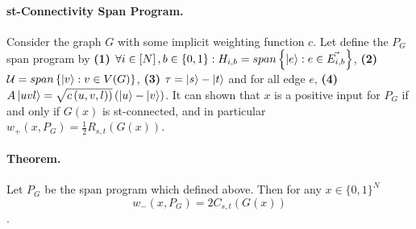 \paragraph{st-Connectivity Span Program.} Consider the graph \(G\) with some implicit weighting function \(c\). Let define the \(P_G\) span program by \textbf{(1)} \( \forall i \in \left[N\right], b\in \left\{0,1\right\} : H_{i,b} = span\left\{ \ket{e} : e \in \vec{E_{i,b}} \right\} \),  \textbf{(2)} \( \mathcal{U} = span\left\{ \ket{v} : v \in V(G) \right\} \), \textbf{(3)} \( \tau = \ket{s} - \ket{t} \)  and for all edge \(e\), \textbf{(4)} \( A\ket{uvl}= \sqrt{c\left(u,v,l)\right) } \left( \ket{u} - \ket{v} \right) \).   It can shown that \(x\) is a positive input for \(P_G\) if and only if \( G(x) \) is st-connected, and in particular \( w_{+} (x,P_G) = \frac{1}{2}R_{s,t}(G(x)) \).

\newcommand{\V}{  V\left( G \right) }
\newcommand{\E}{  \vec{E}\left( G \right) }
\newcommand{\Projx}[2]{ \sqrt{c\left(u,v,l\right) } \left( #1 - #2 \right) }
\newcommand{\Proj}[]{ \Projx{\ket{u}}{ \ket{v}} }
\newcommand{\Vw}[1]{\mathcal{V}_w \left(#1\right)}
\newcommand{\tu}{\left(u,v,l\right)}

\newcommand{\Pot}[]{\mathcal{V} \left(v\right) \bra{v}}

\paragraph{Theorem.} Let \(P_G\) be the span program which defined above. Then for any \( x \in \{0,1\}^N \) \[ w_{-}\left(x,P_G\right) = 2C_{s,t}\left(G\left(x\right)\right) \]. 
